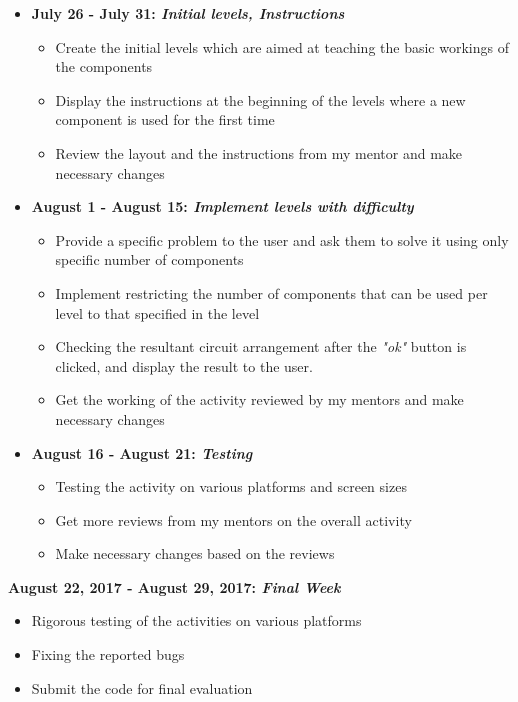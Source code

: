 \documentclass[preprint,12pt]{elsarticle}
\begin{document}
\begin{itemize}

\item \textbf{July 26 - July 31: \textit{Initial levels, Instructions}}

\begin{itemize}
\item Create the initial levels which are aimed at teaching the basic workings of the components
\item Display the instructions at the beginning of the levels where a new component is used for the first time
\item Review the layout and the instructions from my mentor and make necessary changes
\end{itemize}

\item \textbf{August 1 - August 15: \textit{Implement levels with difficulty}}

\begin{itemize}
\item Provide a specific problem to the user and ask them to solve it using only specific number of components
\item Implement restricting the number of components that can be used per level to that specified in the level
\item Checking the resultant circuit arrangement after the \textit{"ok"} button is clicked, and display the result to the user.
\item Get the working of the activity reviewed by my mentors and make necessary changes
\end{itemize}

\item \textbf{August 16 - August 21: \textit{Testing}}

\begin{itemize}
\item Testing the activity on various platforms and screen sizes
\item Get more reviews from my mentors on the overall activity
\item Make necessary changes based on the reviews
\end{itemize}

\end{itemize}

\textbf{August 22, 2017 - August 29, 2017: \textit{Final Week}}

\begin{itemize}
\item Rigorous testing of the activities on various platforms
\item Fixing the reported bugs
\item Submit the code for final evaluation
\end{itemize}
\end{document}
